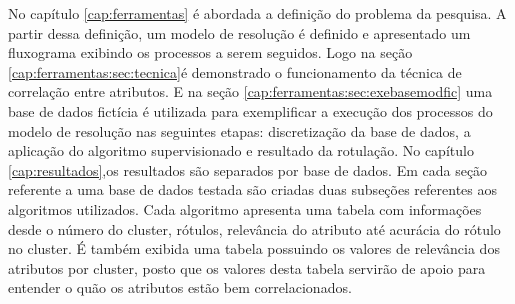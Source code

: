 No capítulo \ref{cap:ferramentas} é abordada a definição do problema da pesquisa. A partir dessa definição, um modelo de resolução é definido e apresentado um fluxograma exibindo os processos a serem seguidos. Logo na seção \ref{cap:ferramentas:sec:tecnica}é demonstrado o funcionamento da técnica de correlação entre atributos. E na seção \ref{cap:ferramentas:sec:exebasemodfic} uma base de dados fictícia é utilizada para exemplificar a execução dos processos do modelo de resolução nas seguintes etapas: discretização da base de dados, a aplicação do algoritmo supervisionado e resultado da rotulação. No capítulo \ref{cap:resultados},os resultados são separados por base de dados. Em cada seção referente a uma base de dados testada são criadas duas subseções referentes aos algoritmos utilizados. Cada algoritmo apresenta uma tabela com informações desde o número do cluster, rótulos, relevância do atributo até acurácia do rótulo no cluster. É também exibida uma tabela possuindo os valores de relevância dos atributos por cluster, posto que os valores desta tabela servirão de apoio para entender o quão os atributos estão bem correlacionados. 





